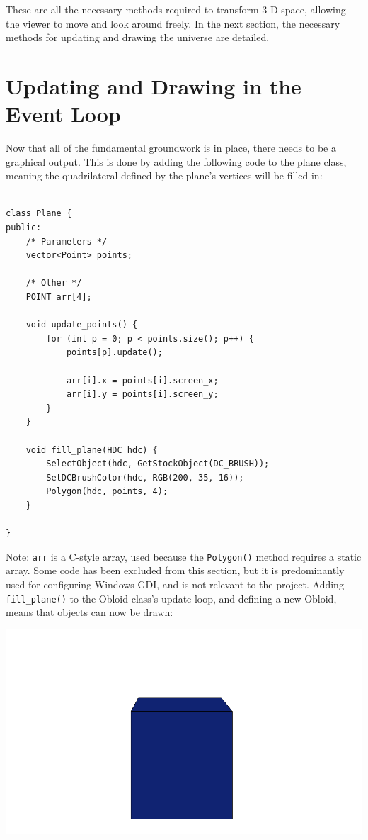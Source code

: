 \documentclass{article}
\begin{document}
These are all the necessary methods required to transform 3-D space, allowing the viewer to move and look around freely. In the next section, the necessary methods for updating and drawing the universe are detailed.
\newpage

\section{Updating and Drawing in the Event Loop}

Now that all of the fundamental groundwork is in place, there needs to be a graphical output. This is done by adding the following code to the plane class, meaning the quadrilateral defined by the plane's vertices will be filled in:

\begin{lstlisting}

class Plane {
public:
	/* Parameters */
	vector<Point> points;
	
	/* Other */
	POINT arr[4];
	
	void update_points() {
		for (int p = 0; p < points.size(); p++) {
			points[p].update();
			
			arr[i].x = points[i].screen_x;
			arr[i].y = points[i].screen_y;
		}
	}
	
	void fill_plane(HDC hdc) {	
		SelectObject(hdc, GetStockObject(DC_BRUSH));
		SetDCBrushColor(hdc, RGB(200, 35, 16));
		Polygon(hdc, points, 4);
	}
	
}
\end{lstlisting}

Note: \verb|arr| is a C-style array, used because the \verb|Polygon()| method requires a static array. Some code has been excluded from this section, but it is predominantly used for configuring Windows GDI, and is not relevant to the project.
\newpage
Adding \verb|fill_plane()| to the Obloid class's update loop, and defining a new Obloid, means that objects can now be drawn:

\includegraphics[width=1\textwidth]{first_cube.png}
\end{document}
